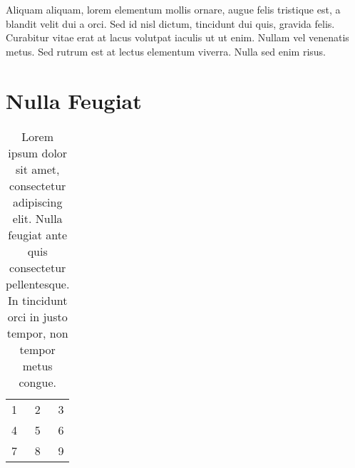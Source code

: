 \documentclass[dissertation]{msudissertation}
\begin{document}
Aliquam aliquam, lorem elementum mollis ornare, augue felis tristique est, a blandit velit dui a orci. Sed id nisl dictum, tincidunt dui quis, gravida felis. Curabitur vitae erat at lacus volutpat iaculis ut ut enim. Nullam vel venenatis metus. Sed rutrum est at lectus elementum viverra. Nulla sed enim risus.

\chapter{Nulla Feugiat}

\begin{table}[h]
  \centering
  \begin{tabular}{l c r}
    1 & 2 & 3 \\
    4 & 5 & 6 \\
    7 & 8 & 9 \\
  \end{tabular}
  \caption{Lorem ipsum dolor sit amet, consectetur adipiscing elit. Nulla feugiat ante quis consectetur pellentesque. In tincidunt orci in justo tempor, non tempor metus congue.\cite{exampleref2}}
\end{table}


\renewcommand{\bibname}{References}

\end{document}
